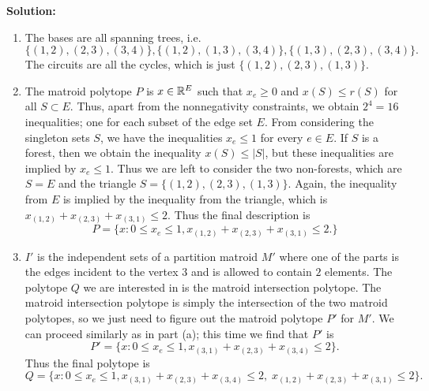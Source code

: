 \documentclass[12pt]{article}
\begin{document}
\begin{enumerate}
\indent \textbf{Solution:}
\begin{enumerate}
\item The bases are all spanning trees, i.e.
$$\{(1,2),(2,3),(3,4)\}, \{(1,2),(1,3),(3,4)\}, \{(1,3), (2,3), (3,4)\}.$$
The circuits are all the cycles, which is just $\{(1,2), (2,3), (1,3)\}$.
\item The matroid polytope $P$ is $x \in {\mathbb R}^E$ such that $x_e \geq 0$ and $x(S) \leq r(S)$ for all $S \subset E$. Thus, apart from the nonnegativity constraints, we obtain $2^4 = 16$ inequalities; one for each subset of the edge set $E$. From considering the singleton sets $S$, we have the inequalities $x_e \leq 1$ for every $e \in E$. If $S$ is a forest, then we obtain the inequality $x(S) \leq |S|$, but these inequalities are implied by $x_e\leq 1$. Thus we are left to consider the two non-forests, which are $S = E$ and the triangle $S= \{(1,2), (2,3), (1,3)\}$. Again, the inequality from $E$ is implied by the inequality from the triangle, which is $x_{(1,2)} + x_{(2,3)} + x_{(3,1)} \leq 2$. Thus the final description is
$$ P = \{x: 0 \leq x_e \leq 1, x_{(1,2)} + x_{(2,3)} + x_{(3,1)} \leq 2.\}$$
\item $I'$ is the independent sets of a partition matroid $M'$ where one of the parts is the edges incident to the vertex $3$ and is allowed to contain $2$ elements. The polytope $Q$ we are interested in is the matroid intersection polytope. The matroid intersection polytope is simply the intersection of the two matroid polytopes, so we just need to figure out the matroid polytope $P'$ for $M'$. We can proceed similarly as in part (a); this time we find that $P'$ is
$$ P' = \{x: 0 \leq x_e \leq 1, x_{(3,1)} + x_{(2,3)} + x_{(3,4)} \leq 2\}.$$
Thus the final polytope is
$$ Q = \{x: 0 \leq x_e \leq 1, x_{(3,1)} + x_{(2,3)} + x_{(3,4)} \leq 2,\; x_{(1,2)} + x_{(2,3)} + x_{(3,1)} \leq 2\}.$$
\end{enumerate}



\end{enumerate}
\end{document}
